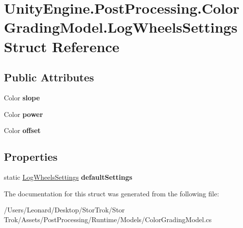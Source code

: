 \hypertarget{struct_unity_engine_1_1_post_processing_1_1_color_grading_model_1_1_log_wheels_settings}{}\section{Unity\+Engine.\+Post\+Processing.\+Color\+Grading\+Model.\+Log\+Wheels\+Settings Struct Reference}
\label{struct_unity_engine_1_1_post_processing_1_1_color_grading_model_1_1_log_wheels_settings}
\subsection*{Public Attributes}
\begin{DoxyCompactItemize}
\item 
\mbox{\label{struct_unity_engine_1_1_post_processing_1_1_color_grading_model_1_1_log_wheels_settings_a7f494c64bb76d4f2ff2964062444fadb}} 
Color {\bfseries slope}
\item 
\mbox{\label{struct_unity_engine_1_1_post_processing_1_1_color_grading_model_1_1_log_wheels_settings_adf368213cad3dabd7d738f0107d31089}} 
Color {\bfseries power}
\item 
\mbox{\label{struct_unity_engine_1_1_post_processing_1_1_color_grading_model_1_1_log_wheels_settings_ad89a46fb9a7ad450ecd2687fcde2b02c}} 
Color {\bfseries offset}
\end{DoxyCompactItemize}
\subsection*{Properties}
\begin{DoxyCompactItemize}
\item 
\mbox{\label{struct_unity_engine_1_1_post_processing_1_1_color_grading_model_1_1_log_wheels_settings_ab7c51b8a45966521c63d4817f71b86dd}} 
static \hyperlink{struct_unity_engine_1_1_post_processing_1_1_color_grading_model_1_1_log_wheels_settings}{Log\+Wheels\+Settings} {\bfseries default\+Settings}
\end{DoxyCompactItemize}


The documentation for this struct was generated from the following file\+:\begin{DoxyCompactItemize}
\item 
/\+Users/\+Leonard/\+Desktop/\+Stor\+Trok/\+Stor Trok/\+Assets/\+Post\+Processing/\+Runtime/\+Models/Color\+Grading\+Model.\+cs\end{DoxyCompactItemize}
